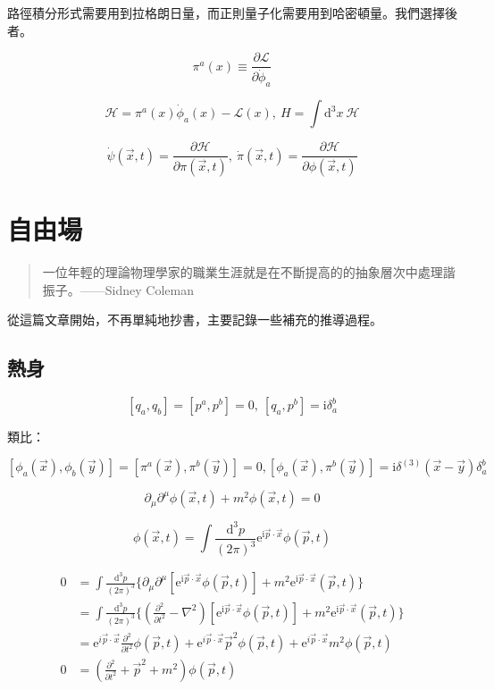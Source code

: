 \documentclass{article}
\begin{document}
路徑積分形式需要用到拉格朗日量，而正則量子化需要用到哈密頓量。我們選擇後者。

$$\pi^{a}(x)\equiv\frac{\partial\mathcal{L}}{\partial\dot{\phi}_a}$$

$$\mathcal{H}=\pi^a(x)\dot{\phi}_{a}(x)-\mathcal{L}(x),\ H=\int\mathrm{d}^3x\ \mathcal{H}$$

$$\dot{\psi}(\vec{x},t)=\frac{\partial\mathcal{H}}{\partial\pi(\vec{x},t)},\ \dot\pi(\vec{x},t)=\frac{\partial\mathcal{H}}{\partial\phi(\vec{x},t)}$$

\section{自由場}

\begin{quote}
  一位年輕的理論物理學家的職業生涯就是在不斷提高的的抽象層次中處理諧振子。——Sidney Coleman
\end{quote}

從這篇文章開始，不再單純地抄書，主要記錄一些補充的推導過程。

\subsection{熱身}

$$[q_{a},q_{b}]=[p^{a},p^{b}]=0,\ [q_{a},p^b]=\mathrm{i}\delta^b_a$$

類比：

$$[\phi_a(\vec{x}),\phi_b(\vec{y})]=[\pi^a(\vec{x}),\pi^b(\vec{y})]=0, [\phi_{a}(\vec{x}),\pi^b(\vec{y})]=\mathrm{i}\delta^{(3)}(\vec{x}-\vec{y})\delta^b_a$$

$$\partial_{\mu}\partial^{\mu}\phi(\vec{x},t)+m^2\phi(\vec{x},t)=0$$

$$\phi(\vec{x},t)=\int\frac{\mathrm{d}^3p}{(2\pi)^3}\mathrm{e}^{\mathrm{i}\vec{p}\cdot\vec{x}}\phi(\vec{p},t)$$

$$\begin{aligned}
    0 & =\int\frac{\mathrm{d}^3p}{(2\pi)^3}\{\partial_{\mu}\partial^{\mu}[\mathrm{e}^{\mathrm{i}\vec{p}\cdot\vec{x}}\phi(\vec{p},t)]+m^2\mathrm{e}^{\mathrm{i}\vec{p}\cdot\vec{x}}(\vec{p},t)\}               \\
      & =\int\frac{\mathrm{d}^3p}{(2\pi)^3}\{(\frac{\partial^2}{\partial t^2}-\nabla^2)[\mathrm{e}^{\mathrm{i}\vec{p}\cdot\vec{x}}\phi(\vec{p},t)]+m^2\mathrm{e}^{\mathrm{i}\vec{p}\cdot\vec{x}}(\vec{p},t)\} \\
      & =\mathrm{e}^{i\vec{p}\cdot\vec{x}}\frac{\partial^2}{\partial t^2}\phi(\vec{p},t)+\mathrm{e}^{i\vec{p}\cdot\vec{x}}\vec{p}^2\phi(\vec{p},t)+\mathrm{e}^{i\vec{p}\cdot\vec{x}}m^2\phi(\vec{p},t)        \\
    0 & =(\frac{\partial^2}{\partial t^2}+\vec{p}^2+m^2)\phi(\vec{p},t)
  \end{aligned}$$
\end{document}
